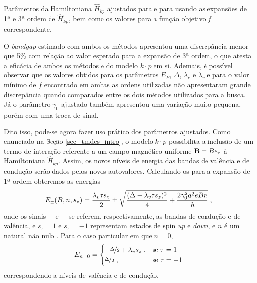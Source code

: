 \begin{table}[p]
  \centering
  \begin{subtable}{\textwidth}
    \centering
    
    \caption{}
    \label{tab:crs2}
  \end{subtable}
  \\
  \vspace{0.6cm}
  \begin{subtable}{\textwidth}
    \centering
    
    \caption{}
    \label{tab:crse2}
  \end{subtable}
  \caption{
    Parâmetros da Hamiltoniana $ \hat{H}_{kp} $ ajustados para  
    e para   usando as expansões de 1ª e 3ª ordem
    de $ \hat{H}_{kp} $, bem como os valores para a função objetivo $f$ correspondente.
  }
  \label{tab:fit_results}
\end{table}

O \textit{bandgap} estimado com ambos os métodos apresentou uma discrepância
menor que 5\% com relação ao valor esperado para a expansão de 3ª ordem, o que
atesta a eficácia de ambos os métodos e do modelo $ k \cdot p $ em si. Ademais,
é possível observar que os valores obtidos para os parâmetros $E_F$, $\Delta$,
$\lambda_c$ e $\lambda_v$ e para o valor mínimo de $f$ encontrado em ambas as
ordens utilizadas não apresentaram grande discrepância quando comparados entre
os dois métodos utilizados para a busca. Já o parâmetro $\gamma_0$ ajustado
também apresentou uma variação muito pequena, porém com uma troca de sinal.

Dito isso, pode-se agora fazer uso prático dos parâmetros ajustados. Como
enunciado na Seção \ref{sec_tmdcs_intro}, o modelo $ k \cdot p $ possibilita a
inclusão de um termo de interação referente a um campo magnético uniforme 
$ \mathbf{B} = B e_z $ à Hamiltoniana $ \hat{H}_{kp} $. Assim, os novos níveis de
energia das bandas de valência e de condução serão dados pelos novos
autovalores. Calculando-os para a expansão de 1ª ordem obteremos as energias
\begin{equation}
  E_\pm (B, n, s_z) = \frac{\lambda_v \tau s_z}{2} \pm 
  \sqrt{
    \frac{(\Delta - \lambda_v \tau s_z)^2}{4} + 
    \frac{2 \gamma_0^2 a^2 e B n}{\hbar}
  }
  \;\mathrm{,}
  \label{eq:landau_levels}
\end{equation}
onde os sinais $+$ e $-$ se referem, respectivamente, as bandas de condução e de
valência, e $ s_z = 1 $ e $ s_z = -1 $ representam estados de spin \textit{up} e
\textit{down}, e $n$ é um natural não nulo \cite{dias2016tmdc,dias2016article,rose2013}. Para o caso
particular em que $ n = 0 $, 
\begin{equation}
  E_{n = 0} =
  \begin{cases}
    - \nicefrac{\Delta}{2} + \lambda_v s_z \;, & \text{se } \tau = 1  \\
    \nicefrac{\Delta}{2}                   \;, & \text{se } \tau = -1 \\
  \end{cases}
  \label{eq:landau_level_for_null_n}
\end{equation}
correspondendo a níveis de valência e de condução.

